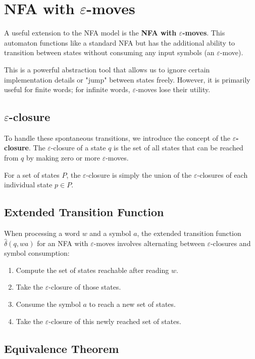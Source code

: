 \section{NFA with $\varepsilon$-moves}

A useful extension to the NFA model is the \textbf{NFA with $\varepsilon$-moves}. This automaton functions like a standard NFA but has the additional ability to transition between states without consuming any input symbols (an $\varepsilon$-move). 

This is a powerful abstraction tool that allows us to ignore certain implementation details or "jump" between states freely. However, it is primarily useful for finite words; for infinite words, $\varepsilon$-moves lose their utility.

\subsection{$\varepsilon$-closure}

To handle these spontaneous transitions, we introduce the concept of the \textbf{$\varepsilon$-closure}. The $\varepsilon$-closure of a state $q$ is the set of all states that can be reached from $q$ by making zero or more $\varepsilon$-moves. 

For a set of states $P$, the $\varepsilon$-closure is simply the union of the $\varepsilon$-closures of each individual state $p \in P$.

\subsection{Extended Transition Function}

When processing a word $w$ and a symbol $a$, the extended transition function $\hat{\delta}(q, wa)$ for an NFA with $\varepsilon$-moves involves alternating between $\varepsilon$-closures and symbol consumption:
\begin{enumerate}
\item Compute the set of states reachable after reading $w$.
\item Take the $\varepsilon$-closure of those states.
\item Consume the symbol $a$ to reach a new set of states.
\item Take the $\varepsilon$-closure of this newly reached set of states.
\end{enumerate}

\subsection{Equivalence Theorem}

